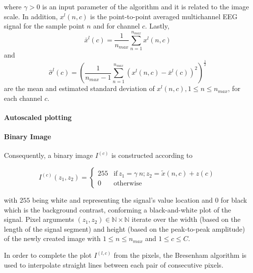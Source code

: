 \noindent where $\gamma > 0$ is an input parameter of the algorithm and  it is related to the image scale. In addition, $ x^l(n,c) $ is the point-to-point averaged multichannel EEG signal for the sample point $n$ and for channel $c$. Lastly, $$\bar{x}^l(c) =\frac{1}{n_{max}}\sum_{n=1}^{n_{max}}x^l(n,c)$$ and $$ \hat{\sigma}^l(c) = (\frac{1}{n_{max}-1}\sum_{n=1}^{n_{max}}(x^l(n,c)-\bar{x}^l(c))^2 )^{\frac{1}{2}}$$ are the mean and estimated standard deviation of $x^l(n,c), 1 \leq n \leq n_{max}$, for each channel $c$.

\paragraph{Autoscaled plotting}

\paragraph{Binary Image}

Consequently, a binary image $I^{(c)}$ is constructed according to

\begin{equation}
I^{(c)}(z_1,z_2) = \left\{ \begin{array}{rl}
255 & \text{if} \,  z_1 = \gamma \  n; \! z_2 = \tilde{x}(n,c) + z(c) \\
0   & \mbox{otherwise}
\end{array}\right.
\label{eq:images}
\end{equation}

\noindent with $255$ being white and representing the signal's value location and $0$ for black which is the background contrast, conforming a black-and-white plot of the signal.  Pixel arguments $ (z_1,z_2) \in \mathbb{N} \times \mathbb{N}$ iterate over the width (based on the length of the signal segment) and height (based on the peak-to-peak amplitude) of the newly created image with $1 \leq n \leq n_{max}$ and $1 \leq c \leq C$.  
  
In order to complete the plot $I^{(l,c)}$ from the pixels, the Bresenham \cite{Bresenham1965,Ramele2016} algorithm is used to interpolate straight lines between each pair of  consecutive pixels.

